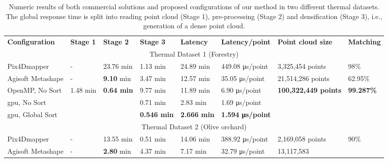 \renewcommand{\arraystretch}{1.3}
\begin{table}
    \centering
    \sffamily\footnotesize
    \caption{Numeric results of both commercial solutions and proposed configurations of our method in two different thermal datasets. The global response time is split into reading point cloud (Stage 1), pre-processing (Stage 2) and densification (Stage 3), i.e., generation of a dense point cloud.\\ }
    \label{table:thermal_results}
    \begin{tabular}{l@{\hskip 0.25in}|lll|l|l|l|l}
    \toprule
    \textbf{Configuration} & \textbf{Stage 1} & \textbf{Stage 2} & \textbf{Stage 3} & \textbf{Latency} & \textbf{Latency/point} & \textbf{Point cloud size} & \textbf{Matching}\\
    \cmidrule{1-8}
    \multicolumn{8}{c}{Thermal Dataset 1 (Forestry)}\\
    \cmidrule{1-8}
    Pix4Dmapper & - & 23.76 \si{\minute} & 1.13 \si{\minute} & 24.89 \si{\minute} & 449.08 \si{\micro\second}/point & 3,325,454 points & 98\%\\
    Agisoft Metashape & - & \textbf{9.10} \si{\minute} & 3.47 \si{\minute} & 12.57 \si{\minute} & 35.05 \si{\micro\second}/point & 21,514,286 points & 62.95\%\\
    \cmidrule{1-8}
    OpenMP, No Sort & \multirow{\numExperiments}{*}{1.48 \si{\minute}} & \multirow{\numExperiments}{*}{\textbf{0.64 \si{\minute}}} & 9.77 \si{\minute} & 11.89 \si{\minute} & 6.90 \si{\micro\second}/point & \multirow{\numExperiments}{*}{\textbf{100,322,449 points}} & \multirow{\numExperiments}{*}{\textbf{99.287\%}}\\
    \acrshort{gpu}, No Sort & & & 0.71 \si{\minute} & 2.83 \si{\minute} & 1.69 \si{\micro\second}/point & &\\
    \acrshort{gpu}, Global Sort & & & \textbf{0.546 \si{\minute}} & \textbf{2.666 \si{\minute}} & \textbf{1.594 \si{\micro\second}/point} & &\\
    \bottomrule
    \toprule
    \multicolumn{8}{c}{Thermal Dataset 2 (Olive orchard)}\\
    \cmidrule{1-8}
    Pix4Dmapper & - & 13.55 \si{\minute} & 0.51 \si{\minute} & 14.06 \si{\minute} & 388.92 \si{\micro\second}/point & 2,169,058 points & 90\%\\
    Agisoft Metashape & - & \textbf{2.80} \si{\minute} & 4.37 \si{\minute} & 7.17 \si{\minute} & 32.79 \si{\micro\second}/point & 13,117,583 

\end{tabular}
\end{table}
